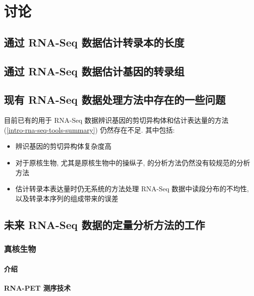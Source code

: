 \chapter{讨论}

\section{通过 RNA-Seq 数据估计转录本的长度}

\section{通过 RNA-Seq 数据估计基因的转录组}

\section{现有 RNA-Seq 数据处理方法中存在的一些问题}
目前已有的用于 RNA-Seq 数据辨识基因的剪切异构体和估计表达量的方法 
(\ref{intro-rna-seq-tools-summary}) 仍然存在不足. 
其中包括: 
\begin{itemize}
\item 辨识基因的剪切异构体复杂度高

\item 对于原核生物, 尤其是原核生物中的操纵子, 的分析方法仍然没有较规范的分析方法 

\item 估计转录本表达量时仍无系统的方法处理 RNA-Seq 数据中读段分布的不均性, 
以及转录本序列的组成带来的误差 \cite{oshlack2009transcript, jones2012new} 
\end{itemize}

\section{未来 RNA-Seq 数据的定量分析方法的工作}

\subsection{真核生物}

\subsubsection{介绍} %

\subsubsection{RNA-PET 测序技术} %

